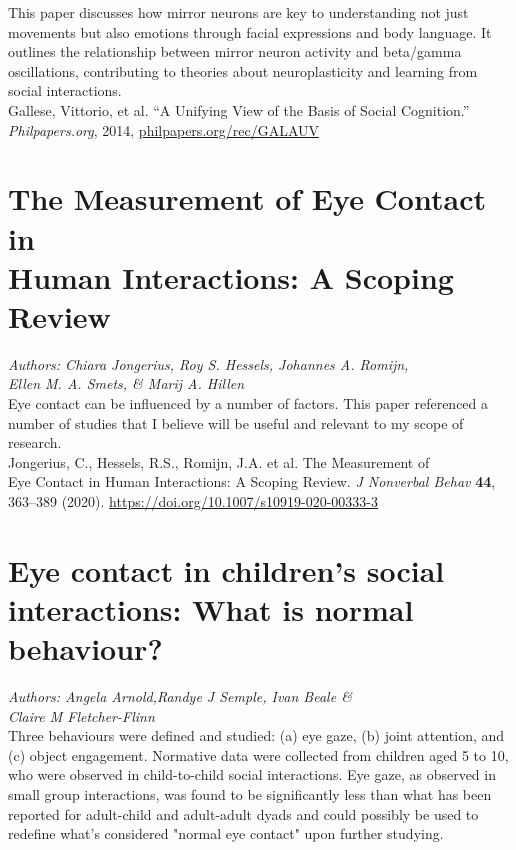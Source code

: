 \documentclass[12pt]{article}
\begin{document}
\noindent This paper discusses how mirror neurons are key to understanding not just movements but also emotions through facial expressions and body language. It outlines the relationship between mirror neuron activity and beta/gamma oscillations, contributing to theories about neuroplasticity and learning from social interactions.\\

\noindent Gallese, Vittorio, et al. “A Unifying View of the Basis of Social Cognition.” \textit{Philpapers.org}, 2014, \href{http://philpapers.org/rec/GALAUV}{philpapers.org/rec/GALAUV}

\section{The Measurement of Eye Contact in\\Human Interactions: A Scoping Review}

\noindent\textit{Authors: Chiara Jongerius, Roy S. Hessels, Johannes A. Romijn,\\Ellen M. A. Smets, \& Marij A. Hillen}\\

\noindent‌Eye contact can be influenced by a number of factors. This paper referenced a number of studies that I believe will be useful and relevant to my scope of research.\\

\noindent Jongerius, C., Hessels, R.S., Romijn, J.A. et al. The Measurement of\\Eye Contact in Human Interactions: A Scoping Review. \textit{J Nonverbal Behav} \textbf{44}, 363–389 (2020). \href{https://doi.org/10.1007/s10919-020-00333-3}{https://doi.org/10.1007/s10919-020-00333-3}

\section{Eye contact in children's social interactions: What is normal behaviour?}

\noindent\textit{Authors: Angela Arnold,Randye J Semple, Ivan Beale \& \\Claire M Fletcher-Flinn}\\

\noindent Three behaviours were defined and studied: (a) eye gaze, (b) joint attention, and (c) object engagement. Normative data were collected from children aged 5 to 10, who were observed in child-to-child social interactions. Eye gaze, as observed in small group interactions, was found to be significantly less than what has been reported for adult-child and adult-adult dyads and could possibly be used to redefine what's considered "normal eye contact" upon further studying. \\
\end{document}
